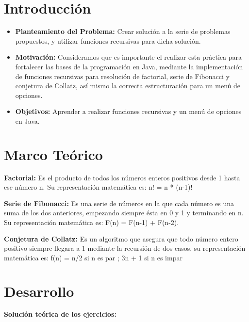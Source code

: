 \documentclass[letterpaper,12pt]{article}
\begin{document}
\tableofcontents
\clearpage

\section{Introducción}

\begin{itemize}
\item \textbf{Planteamiento del Problema:} Crear solución a la serie de problemas propuestos, y utilizar funciones recursivas para dicha solución.
\item \textbf{Motivación:} Consideramos que es importante el realizar esta práctica para fortalecer las bases de la programación en Java, mediante la implementación de funciones recursivas para resolución de factorial, serie de Fibonacci y conjetura de Collatz, así mismo la correcta estructuración para un menú de opciones.
\item \textbf{Objetivos:} Aprender a realizar funciones recursivas y un menú de opciones en Java.
\end{itemize}
\section{Marco Teórico}
\textbf{Factorial:} Es el producto de todos los números enteros positivos desde 1 hasta ese número n. Su representación matemática es: n! = n * (n-1)! ~\cite{factorial}


\textbf{Serie de Fibonacci:} Es una serie de números en la que cada número es una suma de los dos anteriores, empezando siempre ésta en 0 y 1 y terminando en n. Su representación matemática es: F(n) = F(n-1) + F(n-2).~\cite{fibonacci}


\textbf{Conjetura de Collatz:} Es un algoritmo que asegura que todo número entero positivo siempre llegara a 1 mediante la recursión de dos casos, su representación matemática es: f(n) = n/2 si n es par ; 3n + 1 si n es impar~\cite{collatz}

\section{Desarrollo}

\textbf{Solución teórica de los ejercicios:}
\end{document}
